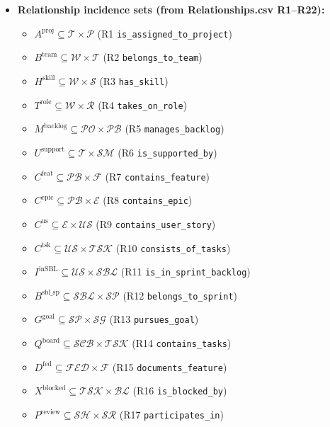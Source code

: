 \documentclass[11pt,a4paper]{article}
\begin{document}
\begin{itemize}[leftmargin=2em]
  \item \textbf{Relationship incidence sets (from Relationships.csv R1--R22):}
  \begin{itemize}
     \item $A^{\mathrm{proj}} \subseteq \mathcal{T}\times\mathcal{P}$ (R1 \texttt{is\_assigned\_to\_project})
     \item $B^{\mathrm{team}} \subseteq \mathcal{W}\times\mathcal{T}$ (R2 \texttt{belongs\_to\_team})
     \item $H^{\mathrm{skill}} \subseteq \mathcal{W}\times\mathcal{S}$ (R3 \texttt{has\_skill})
     \item $T^{\mathrm{role}} \subseteq \mathcal{W}\times\mathcal{R}$ (R4 \texttt{takes\_on\_role})
     \item $M^{\mathrm{backlog}} \subseteq \mathcal{PO}\times\mathcal{PB}$ (R5 \texttt{manages\_backlog})
     \item $U^{\mathrm{support}} \subseteq \mathcal{T}\times\mathcal{SM}$ (R6 \texttt{is\_supported\_by})
     \item $C^{\mathrm{feat}} \subseteq \mathcal{PB}\times\mathcal{F}$ (R7 \texttt{contains\_feature})
     \item $C^{\mathrm{epic}} \subseteq \mathcal{PB}\times\mathcal{E}$ (R8 \texttt{contains\_epic})
     \item $C^{\mathrm{us}} \subseteq \mathcal{E}\times\mathcal{US}$ (R9 \texttt{contains\_user\_story})
     \item $C^{\mathrm{tsk}} \subseteq \mathcal{US}\times\mathcal{TSK}$ (R10 \texttt{consists\_of\_tasks})
     \item $I^{\mathrm{inSBL}} \subseteq \mathcal{US}\times\mathcal{SBL}$ (R11 \texttt{is\_in\_sprint\_backlog})
     \item $B^{\mathrm{sbl\_sp}} \subseteq \mathcal{SBL}\times\mathcal{SP}$ (R12 \texttt{belongs\_to\_sprint})
     \item $G^{\mathrm{goal}} \subseteq \mathcal{SP}\times\mathcal{SG}$ (R13 \texttt{pursues\_goal})
     \item $Q^{\mathrm{board}} \subseteq \mathcal{SCB}\times\mathcal{TSK}$ (R14 \texttt{contains\_tasks})
     \item $D^{\mathrm{fed}} \subseteq \mathcal{FED}\times\mathcal{F}$ (R15 \texttt{documents\_feature})
     \item $X^{\mathrm{blocked}} \subseteq \mathcal{TSK}\times\mathcal{BL}$ (R16 \texttt{is\_blocked\_by})
     \item $P^{\mathrm{review}} \subseteq \mathcal{SH}\times\mathcal{SR}$ (R17 \texttt{participates\_in})

\end{itemize}
\end{itemize}
\end{document}
